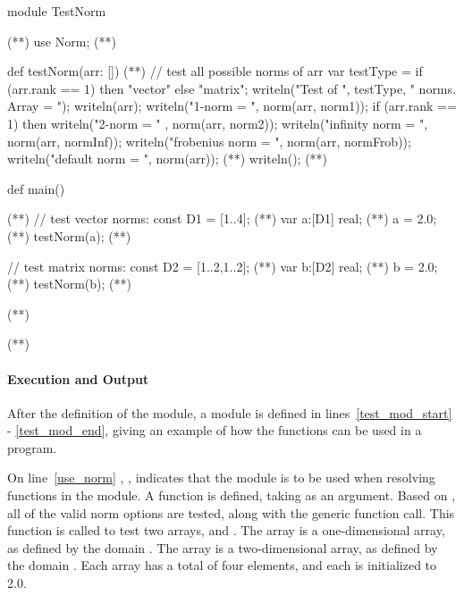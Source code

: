 \begin{numberedchapel}
module TestNorm { (*\label{test_mod_start}*)
  use Norm;  (*\label{use_norm}*)

  def testNorm(arr: []) { (*\label{test_start}*)
    // test all possible norms of arr
    var testType = if (arr.rank == 1) then "vector" else "matrix"; 
    writeln("Test of ", testType, " norms.  Array = ");
    writeln(arr);
    writeln("1-norm = ", norm(arr, norm1));
    if (arr.rank == 1) then
      writeln("2-norm = " , norm(arr, norm2));
    writeln("infinity norm = ", norm(arr, normInf));
    writeln("frobenius norm = ", norm(arr, normFrob));
    writeln("default norm = ", norm(arr)); (*\label{default_call}*)
    writeln();
  } (*\label{test_end}*)

  def main() {  (*\label{test_main_start}*)
    // test vector norms:
    const D1 = [1..4];  (*\label{test_d1_def}*)
    var a:[D1] real;    (*\label{test_a_def}*)
    a = 2.0;            (*\label{test_a_init}*)
    testNorm(a);        (*\label{testnorm_a_call}*)

    // test matrix norms:
    const D2 = [1..2,1..2];  (*\label{test_d2_def}*)
    var b:[D2] real;         (*\label{test_b_def}*)
    b = 2.0;                 (*\label{test_b_init}*)
    testNorm(b);             (*\label{testnorm_b_call}*)
  }            (*\label{test_main_end}*)
}              (*\label{test_mod_end}*)
\end{numberedchapel}

\paragraph{Execution and Output}
After the definition of the  module, a  module
is defined in lines~\ref{test_mod_start} - \ref{test_mod_end}, giving 
an example of how the  functions can be used in a program.

On line~\ref{use_norm} , , indicates that the  module is to be
used when resolving functions in the  module.  A 
function is defined, taking  as an argument.  Based on ,
all of the valid norm options are tested, along with the generic 
function call.  This  function is called to test two arrays, 
and .  The array  is a one-dimensional array, as defined by the
domain .  The array  is a two-dimensional array, as defined by
the domain .  Each array has a total of four elements, and each
is initialized to 2.0.  

